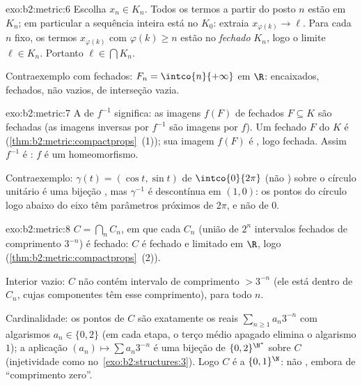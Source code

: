 \begin{solution}{exo:b2:metric:6}
Escolha $x_n \in K_n$. Todos os termos a partir do posto $n$ estão em $K_n$; em
particular a sequência inteira está no  $K_0$: extraia
$x_{\varphi(k)} \to \ell$. Para cada $n$ fixo, os termos
$x_{\varphi(k)}$ com $\varphi(k) \geq n$ estão no \emph{fechado}
$K_n$, logo o limite $\ell \in K_n$. Portanto $\ell \in \bigcap K_n$.

Contraexemplo com fechados: $F_n = \intco{n}{+\infty}$ em $\R$: encaixados,
fechados, não vazios, de interseção vazia.
\end{solution}

\begin{solution}{exo:b2:metric:7}
A  de $f^{-1}$ significa: as imagens $f(F)$ de fechados $F
\subseteq K$ são fechadas (as imagens inversas por $f^{-1}$ são imagens por
$f$). Um fechado $F$ do  $K$ é 
(\cref{thm:b2:metric:compactprops}~(1)); sua imagem 
$f(F)$ é , logo fechada. Assim $f^{-1}$ é : $f$ é
um homeomorfismo.

Contraexemplo: $\gamma(t) = (\cos t, \sin t)$ de
$\intco{0}{2\pi}$ (não ) sobre o círculo unitário é uma
bijeção , mas $\gamma^{-1}$ é descontínua em $(1,0)$:
os pontos do círculo logo abaixo do eixo têm parâmetros próximos de
$2\pi$, e não de $0$.
\end{solution}

\begin{solution}{exo:b2:metric:8}
$C = \bigcap_n C_n$, em que cada $C_n$ (união de $2^n$ intervalos fechados
de comprimento $3^{-n}$) é fechado: $C$ é fechado e limitado
em $\R$, logo  (\cref{thm:b2:metric:compactprops}~(2)).

Interior vazio: $C$ não contém intervalo de comprimento $> 3^{-n}$ (ele
está dentro de $C_n$, cujas componentes têm esse comprimento), para todo
$n$.

Cardinalidade: os pontos de $C$ são exatamente os reais $\sum_{n\geq1}
a_n 3^{-n}$ com algarismos $a_n \in \{0, 2\}$ (em cada etapa, o
terço médio apagado elimina o algarismo $1$); a aplicação $(a_n) \mapsto
\sum a_n 3^{-n}$ é uma bijeção de $\{0,2\}^{\N^*}$ sobre $C$
(injetividade como no~\cref{exo:b2:structures:3}). Logo $C$ é 
a $\{0,1\}^{\N}$: não , embora de ``comprimento zero''.
\end{solution}

